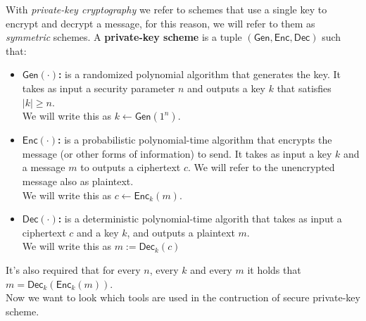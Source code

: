 With \emph{private-key cryptography} we refer to schemes that use a single key to encrypt and decrypt a message, for this reason, we will refer to them as \emph{symmetric} schemes.
A \textbf{private-key scheme} is a tuple $(\mathsf{Gen}, \mathsf{Enc}, \mathsf{Dec})$ such that:
\begin{itemize}
    \item{\textbf{$\mathsf{Gen}(\cdot)$:} is a randomized polynomial algorithm that generates the key. It takes as input a security parameter $n$ and outputs a key $k$ that satisfies $|k| \geq n$.\\
        We will write this as $k \leftarrow \mathsf{Gen}(1^n)$.}
    \item{\textbf{$\mathsf{Enc}(\cdot)$:} is a probabilistic polynomial-time algorithm that encrypts the message (or other forms of information) to send. It takes as input a key $k$ and a message $m$ to outputs a ciphertext $c$. We will refer to the unencrypted message also as plaintext.\\
        We will write this as $c \leftarrow \mathsf{Enc}_k(m)$.}
    \item{\textbf{$\mathsf{Dec}(\cdot)$:} is a deterministic polynomial-time algorith that takes as input a ciphertext $c$ and a key $k$, and outputs a plaintext $m$.\\
        We will write this as $m := \mathsf{Dec}_k(c)$}
\end{itemize}
It's also required that for every $n$, every $k$ and every $m$ it holds that $m = \mathsf{Dec}_k(\mathsf{Enc}_k(m))$.\\
Now we want to look which tools are used in the contruction of secure private-key scheme.
